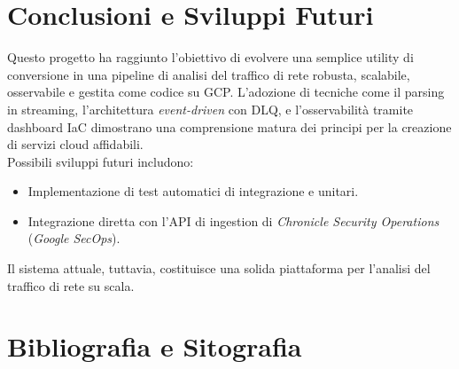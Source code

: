 \documentclass[11pt, a4paper]{article}
\begin{document}
\section{Conclusioni e Sviluppi Futuri}
\label{sec:conclusioni}

Questo progetto ha raggiunto l'obiettivo di evolvere una semplice utility di conversione in una pipeline di analisi del traffico di rete robusta, scalabile, osservabile e gestita come codice su GCP. L'adozione di tecniche come il parsing in streaming, l'architettura \textit{event-driven} con DLQ, e l'osservabilità tramite dashboard IaC dimostrano una comprensione matura dei principi per la creazione di servizi cloud affidabili.\\

Possibili sviluppi futuri includono:
\begin{itemize}
    \item Implementazione di test automatici di integrazione e unitari.
    \item Integrazione diretta con l'API di ingestion di \textit{Chronicle Security Operations} (\textit{Google SecOps}).
\end{itemize} 

Il sistema attuale, tuttavia, costituisce una solida piattaforma per l'analisi del traffico di rete su scala.
\newpage

\section{Bibliografia e Sitografia}
\label{sec:bibliografia}
\end{document}

